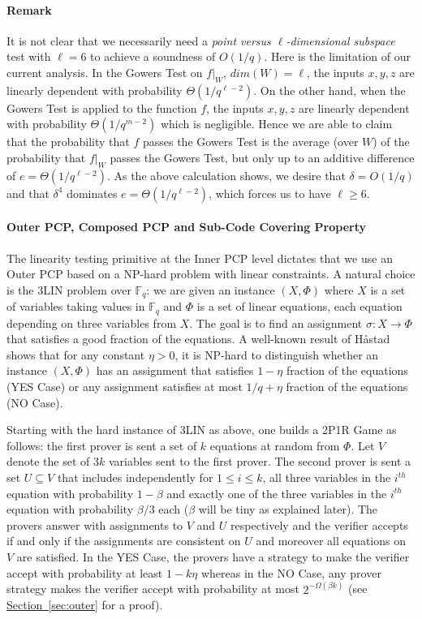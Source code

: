 \documentclass[10pt]{article}
\theoremstyle{definition}
\numberwithin{equation}{section}
\newcommand{\expref}[2]{\texorpdfstring{\hyperref[#2]{#1~\ref{#2}}}{#1~\ref{#2}}}
\newcommand\F{\mathbb{F}}
\newcommand{\cclass}[1]{\textsf{#1}}
\renewcommand{\mapsto}{\to}
\begin{document}
\paragraph{Remark} It is not clear that we necessarily need a \emph{point
versus $\ell$-dimensional subspace} test with $\ell=6$
to achieve a soundness of $O({1}/{q})$. Here is the
limitation of our current analysis.  In the Gowers Test
on $f|_W$, $dim(W)=\ell$, the
inputs $x, y, z$ are linearly dependent with probability
$\Theta({1}/{q^{\ell-2}})$. On the other hand, when the Gowers Test is
applied to the function $f$, the inputs $x,y,z$ are linearly dependent with probability
$\Theta({1}/{q^{m-2}} )$ which is negligible.  Hence we are able to claim that
the probability that $f$ passes the Gowers Test is the average (over $W$)  of the probability that $f|_W$ passes the Gowers Test, but only up to an additive difference of $e = \Theta({1}/{q^{\ell-2}})$. As the above calculation shows, we desire that $\delta
=O({1}/{q})$ and that $\delta^4$ dominates
$e = \Theta({1}/{q^{\ell-2}})$, which forces us to have $\ell \geq 6$.



\paragraph{Outer PCP, Composed PCP and Sub-Code Covering Property}
The linearity testing primitive at the Inner PCP level dictates that we use an Outer PCP
based on a \cclass{NP}-hard problem with linear constraints. A natural choice is the 3LIN problem
over $\F_q$: we are given an instance $(X, \Phi)$ where $X$ is a set of variables taking
values in $\F_q$ and $\Phi$ is a set of linear equations, each equation depending on three
variables from $X$. The goal is to find an assignment $\sigma: X \mapsto \Phi$ that
satisfies a good fraction of the equations. A well-known result of H\aa stad~\cite{Has97}
shows that for any constant $\eta > 0$,
it is \cclass{NP}-hard to distinguish whether an instance $(X,\Phi)$ has an assignment
that satisfies $1-\eta$ fraction of the equations (YES Case) or any assignment satisfies at most
${1}/{q}+\eta$ fraction of the equations (NO Case).

Starting with the hard instance of 3LIN as above, one builds a 2P1R Game as follows:
the first prover is sent a set of $k$ equations at random from $\Phi$. Let $V$ denote
the set of $3k$ variables sent to the first prover. The second prover is sent a set
$U \subseteq V$ that includes independently for $1 \leq i \leq k$, all three variables
in the $i^{th}$ equation with probability $1-\beta$ and exactly one of the three variables
in the $i^{th}$ equation with probability ${\beta}/{3}$ each
($\beta$ will be tiny as explained later).
The provers answer with assignments to $V$ and $U$ respectively and the verifier accepts
if and only if the assignments are consistent on $U$ and moreover all equations on $V$
are satisfied. In the YES Case, the provers have a strategy to make the verifier
accept with probability at least $1-k\eta$ whereas in the NO Case, any prover
strategy makes the verifier accept with probability at most $2^{-\Omega(\beta k)}$ (see
\expref{Section}{sec:outer} for a proof).
\end{document}
